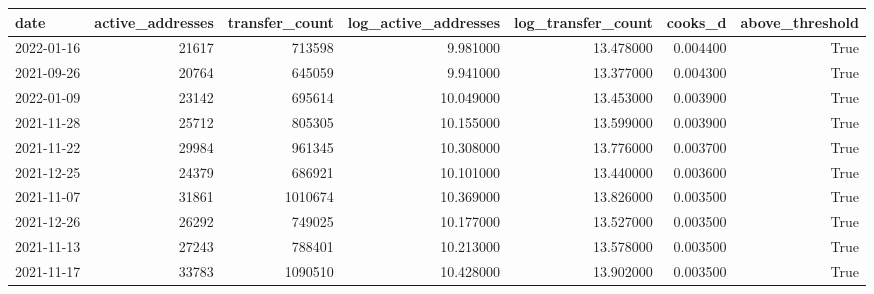 \begin{tabular}{lrrrrrr}
\toprule
date & active_addresses & transfer_count & log_active_addresses & log_transfer_count & cooks_d & above_threshold \\
\midrule
2022-01-16 & 21617 & 713598 & 9.981000 & 13.478000 & 0.004400 & True \\
2021-09-26 & 20764 & 645059 & 9.941000 & 13.377000 & 0.004300 & True \\
2022-01-09 & 23142 & 695614 & 10.049000 & 13.453000 & 0.003900 & True \\
2021-11-28 & 25712 & 805305 & 10.155000 & 13.599000 & 0.003900 & True \\
2021-11-22 & 29984 & 961345 & 10.308000 & 13.776000 & 0.003700 & True \\
2021-12-25 & 24379 & 686921 & 10.101000 & 13.440000 & 0.003600 & True \\
2021-11-07 & 31861 & 1010674 & 10.369000 & 13.826000 & 0.003500 & True \\
2021-12-26 & 26292 & 749025 & 10.177000 & 13.527000 & 0.003500 & True \\
2021-11-13 & 27243 & 788401 & 10.213000 & 13.578000 & 0.003500 & True \\
2021-11-17 & 33783 & 1090510 & 10.428000 & 13.902000 & 0.003500 & True \\
\bottomrule
\end{tabular}
